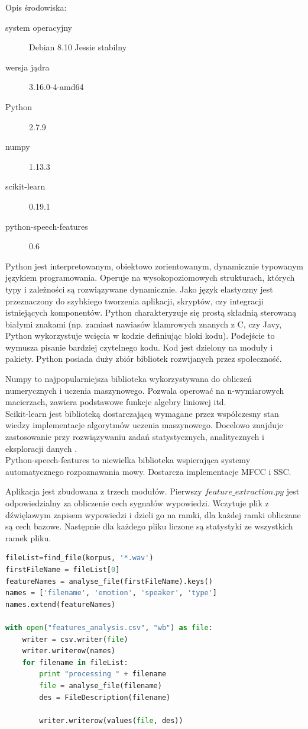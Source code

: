\documentclass[a4paper,12pt,twoside,openany]{report}
\begin{document}
Opis środowiska:
\begin{description}
	\item [system operacyjny] Debian 8.10 Jessie stabilny 
	\item [wersja jądra] 3.16.0-4-amd64
	\item [Python] 2.7.9
	\item [numpy] 1.13.3
	\item [scikit-learn] 0.19.1
	\item [python-speech-features] 0.6
\end{description}
Python jest interpretowanym, obiektowo zorientowanym, dynamicznie typowanym językiem programowania.
Operuje na wysokopoziomowych strukturach, których typy i zależności są rozwiązywane dynamicznie.
Jako język elastyczny jest przeznaczony do szybkiego tworzenia aplikacji, skryptów, czy integracji istniejących komponentów.
Python charakteryzuje się prostą składnią sterowaną białymi znakami 
(np. zamiast nawiasów klamrowych znanych z C, czy Javy, Python wykorzystuje wcięcia w kodzie definiując bloki kodu).
Podejście to wymusza pisanie bardziej czytelnego kodu.
Kod jest dzielony na moduły i pakiety.
Python posiada duży zbiór bibliotek rozwijanych przez społeczność.

Numpy to najpopularniejsza biblioteka wykorzystywana do obliczeń numerycznych i uczenia maszynowego.
Pozwala operować na n-wymiarowych macierzach, zawiera podstawowe funkcje algebry liniowej itd.
\\
Scikit-learn jest biblioteką dostarczającą wymagane przez współczesny stan wiedzy implementacje algorytmów uczenia maszynowego.
Docelowo znajduje zastosowanie przy rozwiązywaniu zadań statystycznych, analitycznych i eksploracji danych \cite{OShaughnessy2008}.  
\\
Python-speech-features to niewielka biblioteka wspierająca systemy automatycznego rozpoznawania mowy. 
Dostarcza implementacje MFCC i SSC.

Aplikacja jest zbudowana z trzech modułów.
Pierwszy $feature\_extraction.py$ jest odpowiedzialny za obliczenie cech sygnałów wypowiedzi. 
Wczytuje plik z dźwiękowym zapisem wypowiedzi i dzieli go na ramki, 
dla każdej ramki obliczane są cech bazowe.
Następnie dla każdego pliku liczone są statystyki ze wszystkich ramek pliku.

\begin{lstlisting}[language=python,caption={Program obliczający cechy wypowiedzi},label={lst:fe}]
fileList=find_file(korpus, '*.wav')
firstFileName = fileList[0]
featureNames = analyse_file(firstFileName).keys()
names = ['filename', 'emotion', 'speaker', 'type']
names.extend(featureNames)

with open("features_analysis.csv", "wb") as file:
    writer = csv.writer(file)
    writer.writerow(names)
    for filename in fileList:
        print "processing " + filename
        file = analyse_file(filename)
        des = FileDescription(filename)

        writer.writerow(values(file, des))	
\end{lstlisting}
\end{document}

